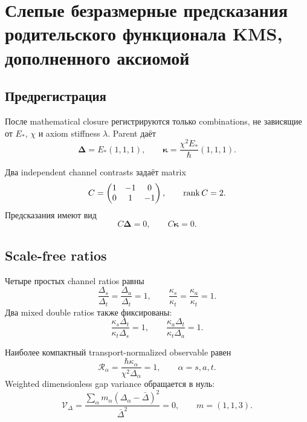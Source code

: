 \chapter{Слепые безразмерные предсказания родительского функционала KMS, дополненного аксиомой}
\label{ch:v9-kms-axiom-blind-prediction}

\section{Предрегистрация}

После mathematical closure регистрируются только combinations, не
зависящие от $E_*$, $\chi$ и axiom stiffness $\lambda$. Parent даёт
\begin{equation}
 \boldsymbol\Delta=E_*(1,1,1),
 \qquad
 \boldsymbol\kappa=\frac{\chi^2E_*}{\hbar}(1,1,1).
 \label{eq:v9-kms-blind-packages}
\end{equation}

Два independent channel contrasts задаёт matrix
\begin{equation}
 C=\begin{pmatrix}1&-1&0\\0&1&-1\end{pmatrix},
 \qquad \operatorname{rank} C=2.
 \label{eq:v9-kms-blind-contrast}
\end{equation}
Предсказания имеют вид
\begin{equation}
 C\boldsymbol\Delta=0,
 \qquad C\boldsymbol\kappa=0.
 \label{eq:v9-kms-blind-contrast-predictions}
\end{equation}

\section{Scale-free ratios}

Четыре простых channel ratios равны
\begin{equation}
 \frac{\Delta_s}{\Delta_t}=\frac{\Delta_a}{\Delta_t}=1,
 \qquad
 \frac{\kappa_s}{\kappa_t}=\frac{\kappa_a}{\kappa_t}=1.
 \label{eq:v9-kms-blind-ratios}
\end{equation}
Два mixed double ratios также фиксированы:
\begin{equation}
 \frac{\kappa_s\Delta_t}{\kappa_t\Delta_s}=1,
 \qquad
 \frac{\kappa_a\Delta_t}{\kappa_t\Delta_a}=1.
 \label{eq:v9-kms-blind-double-ratios}
\end{equation}

Наиболее компактный transport-normalized observable равен
\begin{equation}
 \mathcal R_\alpha=
 \frac{\hbar\kappa_\alpha}{\chi^2\Delta_\alpha}=1,
 \qquad \alpha=s,a,t.
 \label{eq:v9-kms-blind-response}
\end{equation}
Weighted dimensionless gap variance обращается в нуль:
\begin{equation}
 \mathcal V_\Delta=
 \frac{\sum_\alpha m_\alpha(\Delta_\alpha-\bar\Delta)^2}
 {\bar\Delta^2}=0,
 \qquad m=(1,1,3).
 \label{eq:v9-kms-blind-variance}
\end{equation}

